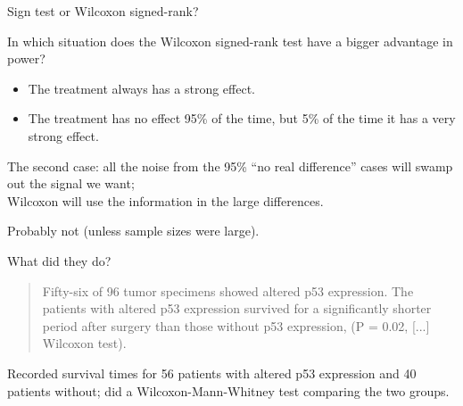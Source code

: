 \begin{frame}{Sign test or Wilcoxon signed-rank?}

  In which situation does the Wilcoxon signed-rank test have a bigger advantage in power?

  \begin{itemize}

    \item The treatment always has a strong effect.

    \item The treatment has no effect 95\% of the time, but 5\% of the time it has a very strong effect.

  \end{itemize}

  \pause

  \vspace{2em}

  The second case: all the noise from the 95\% ``no real difference'' cases will swamp out the signal we want;\\
  Wilcoxon will use the information in the large differences.

  \pause

  \vspace{2em}


  \vspace{1em}

  \pause Probably not (unless sample sizes were large).

\end{frame}

\begin{frame}{What did they do?}
    \begin{quote}
        Fifty-six of 96 tumor specimens showed altered p53 expression.  The patients with altered p53 expression survived for a significantly shorter period after surgery than those without p53 expression, (P = 0.02, [...] Wilcoxon test). 
    \end{quote}

    \pause

    Recorded survival times for 56 patients with altered p53 expression and 40 patients without;
    did a Wilcoxon-Mann-Whitney test comparing the two groups.

\end{frame}

